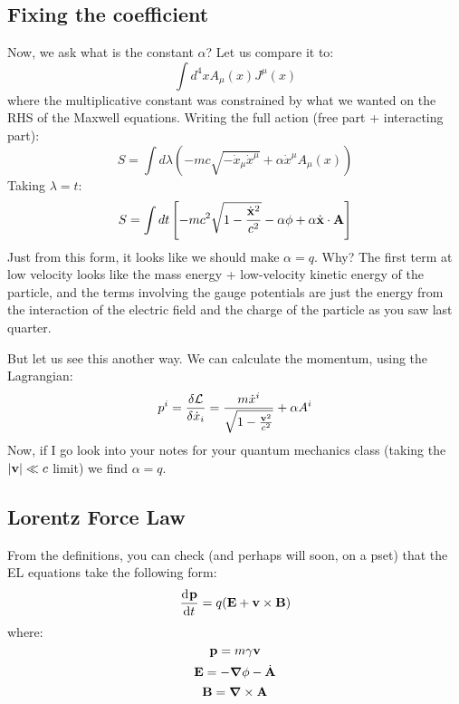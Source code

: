 \subsection{Fixing the coefficient}
Now, we ask what is the constant $\alpha$? Let us compare it to:
\begin{equation}
    \int d^4 x A_\mu(x)J^\mu(x)
\end{equation}
where the multiplicative constant was constrained by what we wanted on the RHS of the Maxwell equations. Writing the full action (free part + interacting part):
\begin{equation}
    S = \int d\lambda(-mc\sqrt{-\dot{x}_\mu \dot{x}^\mu} + \alpha\dot{x}^\mu A_\mu(x))
\end{equation}
Taking $\lambda = t$:
\begin{equation}
    S = \int dt\left[-mc^2\sqrt{1-\frac{\dot{\mathbf{x}}^2}{c^2}} - \alpha \phi + \alpha \dot{\mathbf{x}}\cdot \mathbf{A}\right]
\end{equation}
Just from this form, it looks like we should make $\alpha = q$. Why? The first term at low velocity looks like the mass energy + low-velocity kinetic energy of the particle, and the terms involving the gauge potentials are just the energy from the interaction of the electric field and the charge of the particle as you saw last quarter.

But let us see this another way. We can calculate the momentum, using the Lagrangian:
\begin{equation}
    p^i = \frac{\delta \mathcal{L}}{\delta \dot{x}_i} = \frac{m\dot{x}^i}{\sqrt{1 - \frac{\mathbf{v}^2}{c^2}}} + \alpha A^i
\end{equation}
Now, if I go look into your notes for your quantum mechanics class (taking the $\lvert \mathbf{v} \rvert \ll c$ limit) we find $\alpha = q$.

\subsection{Lorentz Force Law}
From the definitions, you can check (and perhaps will soon, on a pset) that the EL equations take the following form:
\begin{equation}
    \dod{\v{p}}{t} = q(\v{E} + \v{v} \times \v{B})
\end{equation}
where:
\begin{equation}
    \mathbf{p} = m\gamma\mathbf{v}
\end{equation}
\begin{equation}
    \v{E} = -\nabla \phi - \dot{\v{A}}
\end{equation}
\begin{equation}
    \v{B} = \nabla \times \v{A}
\end{equation}

